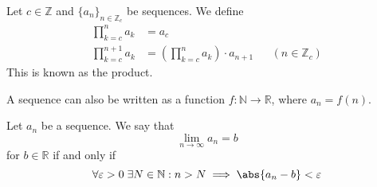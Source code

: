 \begin{definition}\label{def-sequence-recursive:5}
	Let $c\in\mathbb{Z}$ and $\{a_n\}_{n\in\mathbb{Z}_c}$ be sequences. We define \cite[p.51]{wuest2009}
	\begin{align*}
		\prod_{k=c}^n a_k     & = a_c                                                                  \\
		\prod_{k=c}^{n+1} a_k & = \left(\prod_{k=c}^n a_k\right) \cdot a_{n+1} &  & (n\in\mathbb{Z}_c)
	\end{align*}
	This is known as the product.
\end{definition}

\begin{rem}
	A sequence can also be written as a function $f:\mathbb{N}\to\mathbb{R}$,
	where $a_n = f(n)$.
\end{rem}

\begin{definition}\label{def-sequence-limit}
	Let $a_n$ be a sequence. We say that
	\begin{equation*}
		\lim_{n\to\infty}a_n=b
	\end{equation*}
	for $b\in\mathbb{R}$ if and only if
	\begin{equation*}
		\forall\varepsilon>0\;\exists N\in\mathbb{N}: n>N \implies \abs{a_n - b}<\varepsilon
	\end{equation*}
\end{definition}

